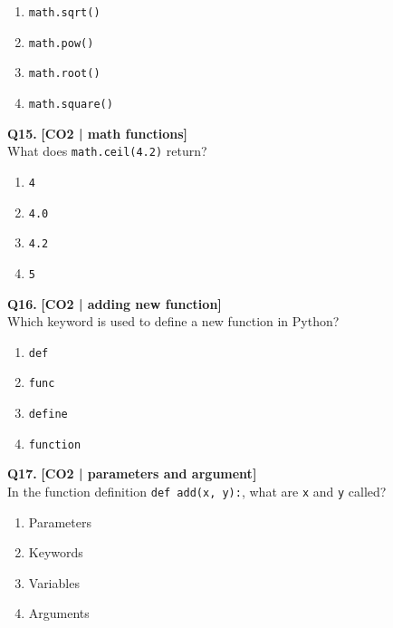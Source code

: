 \begin{enumerate}[label=(\alph*),topsep=2pt,itemsep=1pt,partopsep=0pt,parsep=0pt]
    \item \relax \texttt{math.sqrt()}
    \item \relax \texttt{math.pow()}
    \item \relax \texttt{math.root()}
    \item \relax \texttt{math.square()}
\end{enumerate}
\vspace{{2mm}}

\noindent\textbf{Q15.} \hfill {\small\color{LPUOrange}\textbf{[CO2 | math functions]}}\\[2pt]
What does \texttt{math.ceil(4.2)} return?

\begin{enumerate}[label=(\alph*),topsep=2pt,itemsep=1pt,partopsep=0pt,parsep=0pt]
    \item \relax \texttt{4}
    \item \relax \texttt{4.0}
    \item \relax \texttt{4.2}
    \item \relax \texttt{5}
\end{enumerate}
\vspace{{2mm}}

\noindent\textbf{Q16.} \hfill {\small\color{LPUOrange}\textbf{[CO2 | adding new function]}}\\[2pt]
Which keyword is used to define a new function in Python?

\begin{enumerate}[label=(\alph*),topsep=2pt,itemsep=1pt,partopsep=0pt,parsep=0pt]
    \item \relax \texttt{def}
    \item \relax \texttt{func}
    \item \relax \texttt{define}
    \item \relax \texttt{function}
\end{enumerate}
\vspace{{2mm}}

\noindent\textbf{Q17.} \hfill {\small\color{LPUOrange}\textbf{[CO2 | parameters and argument]}}\\[2pt]
In the function definition \texttt{def add(x, y):}, what are \texttt{x} and \texttt{y} called?

\begin{enumerate}[label=(\alph*),topsep=2pt,itemsep=1pt,partopsep=0pt,parsep=0pt]
    \item \relax Parameters
    \item \relax Keywords
    \item \relax Variables
    \item \relax Arguments
\end{enumerate}
\vspace{{2mm}}

